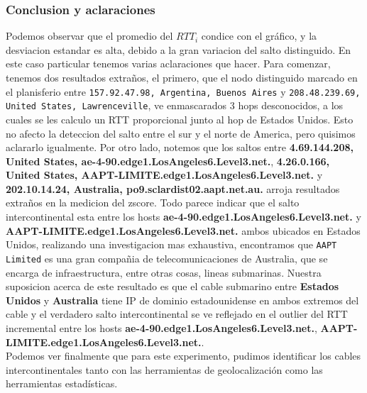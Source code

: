 \subsubsection{Conclusion y aclaraciones}
Podemos observar que el promedio del $RTT_i$ condice con el gráfico, y la desviacion estandar es alta, debido a la gran variacion del salto distinguido. En este caso particular tenemos varias aclaraciones que hacer. Para comenzar, tenemos dos resultados extraños, el primero, que el nodo distinguido marcado en el planisferio entre \texttt{157.92.47.98, Argentina, Buenos Aires} y \texttt{208.48.239.69, United States, Lawrenceville}, ve enmascarados 3 hops desconocidos, a los cuales se les calculo un RTT proporcional junto al hop de Estados Unidos. Esto no afecto la deteccion del salto entre el sur y el norte de America, pero quisimos aclararlo igualmente. Por otro lado, notemos que los saltos entre \textbf{4.69.144.208, United States, ae-4-90.edge1.LosAngeles6.Level3.net.},   \textbf{4.26.0.166, United States, AAPT-LIMITE.edge1.LosAngeles6.Level3.net.} y \textbf{202.10.14.24, Australia, po9.sclardist02.aapt.net.au.} arroja resultados extraños en la medicion del zscore. Todo parece indicar que el salto intercontinental esta entre los hosts \textbf{ae-4-90.edge1.LosAngeles6.Level3.net.} y \textbf{AAPT-LIMITE.edge1.LosAngeles6.Level3.net.} ambos ubicados en Estados Unidos, realizando una investigacion mas exhaustiva, encontramos que \texttt{AAPT Limited} es una gran compañia de telecomunicaciones de Australia, que se encarga de infraestructura, entre otras cosas, lineas submarinas. Nuestra suposicion acerca de este resultado es que el cable submarino entre \textbf{Estados Unidos} y \textbf{Australia} tiene IP de dominio estadounidense en ambos extremos del cable y el verdadero salto intercontinental se ve reflejado en el outlier del RTT incremental entre los hosts \textbf{ae-4-90.edge1.LosAngeles6.Level3.net.}, \textbf{AAPT-LIMITE.edge1.LosAngeles6.Level3.net.}.\\
Podemos ver finalmente que para este experimento, pudimos identificar los cables intercontinentales tanto con las herramientas de geolocalización como las herramientas estadísticas.
